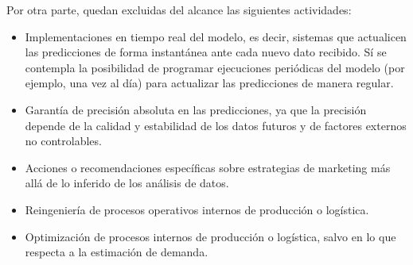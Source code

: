 Por otra parte, quedan excluidas del alcance las siguientes actividades:

\begin{itemize}
    \item Implementaciones en tiempo real del modelo, es decir, sistemas que actualicen las
predicciones de forma instantánea ante cada nuevo dato recibido. Sí se contempla la
posibilidad de programar ejecuciones periódicas del modelo (por ejemplo, una vez al día)
para actualizar las predicciones de manera regular.
	\item Garantía de precisión absoluta en las predicciones, ya que la precisión depende de la
calidad y estabilidad de los datos futuros y de factores externos no controlables.
	\item Acciones o recomendaciones específicas sobre estrategias de marketing más allá de lo
inferido de los análisis de datos.
	\item Reingeniería de procesos operativos internos de producción o logística.
	\item Optimización de procesos internos de producción o logística, salvo en lo que respecta a la estimación de demanda.

\end{itemize}

